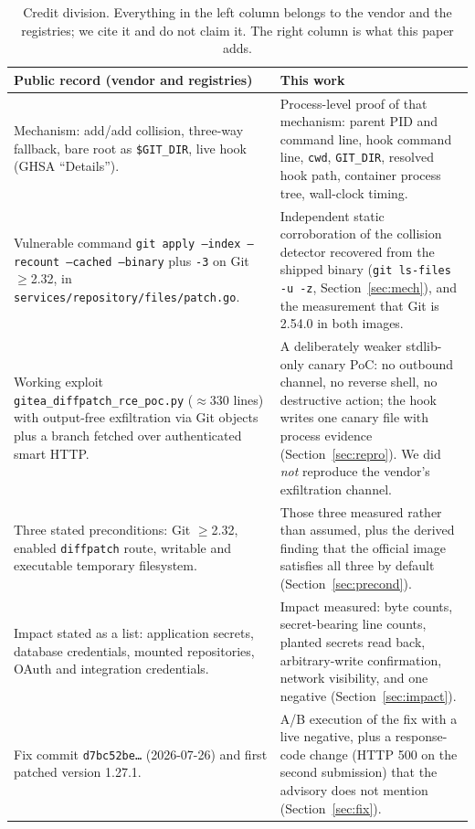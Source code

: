 \documentclass[journal]{IEEEtran}
\begin{document}
\begin{table}[t]
\centering
\footnotesize
\begin{tabular}{@{}p{7.7cm}p{8.1cm}@{}}
\toprule
\textbf{Public record (vendor and registries)} & \textbf{This work} \\
\midrule
Mechanism: add/add collision, three-way fallback, bare root as
\texttt{\$GIT\_DIR}, live hook (GHSA ``Details''). &
Process-level proof of that mechanism: parent PID and command line, hook
command line, \texttt{cwd}, \texttt{GIT\_DIR}, resolved hook path, container
process tree, wall-clock timing. \\
Vulnerable command \texttt{git apply --index --recount --cached --binary} plus
\texttt{-3} on Git $\geq$2.32, in
\texttt{services/repository/files/patch.go}. &
Independent static corroboration of the collision detector recovered from the
shipped binary (\texttt{git ls-files -u -z}, Section~\ref{sec:mech}), and the
measurement that Git is 2.54.0 in both images. \\
Working exploit \texttt{gitea\_diffpatch\_rce\_poc.py} ($\approx$330 lines) with
output-free exfiltration via Git objects plus a branch fetched over
authenticated smart HTTP. &
A deliberately weaker stdlib-only canary PoC: no outbound channel, no reverse
shell, no destructive action; the hook writes one canary file with process
evidence (Section~\ref{sec:repro}). We did \emph{not} reproduce the vendor's
exfiltration channel. \\
Three stated preconditions: Git $\geq$2.32, enabled \texttt{diffpatch} route,
writable and executable temporary filesystem. &
Those three measured rather than assumed, plus the derived finding that the
official image satisfies all three by default
(Section~\ref{sec:precond}). \\
Impact stated as a list: application secrets, database credentials, mounted
repositories, OAuth and integration credentials. &
Impact measured: byte counts, secret-bearing line counts, planted secrets read
back, arbitrary-write confirmation, network visibility, and one negative
(Section~\ref{sec:impact}). \\
Fix commit \texttt{d7bc52be\ldots} (2026-07-26) and first patched version
1.27.1. &
A/B execution of the fix with a live negative, plus a response-code change
(HTTP 500 on the second submission) that the advisory does not mention
(Section~\ref{sec:fix}). \\
\bottomrule
\end{tabular}
\caption{Credit division. Everything in the left column belongs to the vendor
and the registries; we cite it and do not claim it. The right column is what
this paper adds.}
\label{tab:record}
\end{table}
\end{document}
